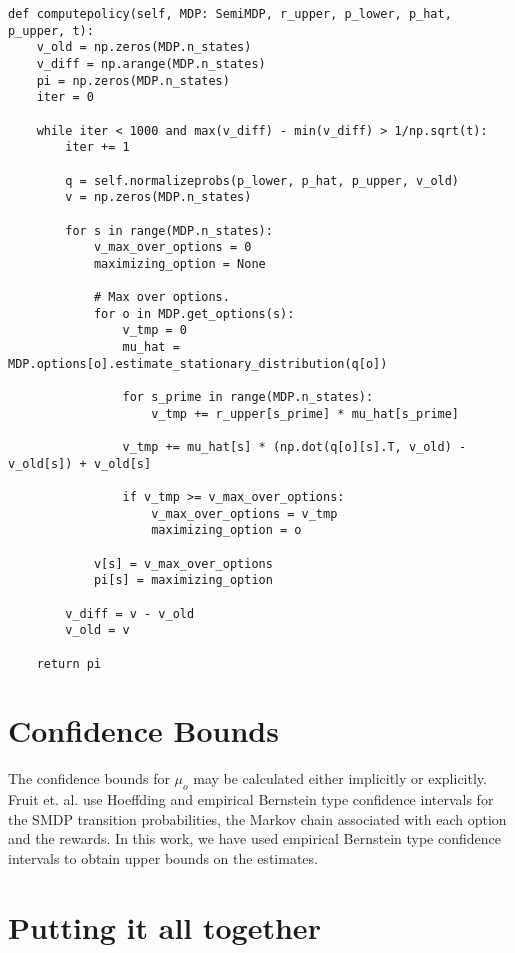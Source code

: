 \begin{verbatim}
def computepolicy(self, MDP: SemiMDP, r_upper, p_lower, p_hat, p_upper, t):
    v_old = np.zeros(MDP.n_states)
    v_diff = np.arange(MDP.n_states)
    pi = np.zeros(MDP.n_states)
    iter = 0

    while iter < 1000 and max(v_diff) - min(v_diff) > 1/np.sqrt(t):
        iter += 1

        q = self.normalizeprobs(p_lower, p_hat, p_upper, v_old)
        v = np.zeros(MDP.n_states)

        for s in range(MDP.n_states):
            v_max_over_options = 0
            maximizing_option = None

            # Max over options.
            for o in MDP.get_options(s):
                v_tmp = 0
                mu_hat = MDP.options[o].estimate_stationary_distribution(q[o])

                for s_prime in range(MDP.n_states):
                    v_tmp += r_upper[s_prime] * mu_hat[s_prime]

                v_tmp += mu_hat[s] * (np.dot(q[o][s].T, v_old) - v_old[s]) + v_old[s]

                if v_tmp >= v_max_over_options:
                    v_max_over_options = v_tmp
                    maximizing_option = o

            v[s] = v_max_over_options
            pi[s] = maximizing_option

        v_diff = v - v_old
        v_old = v

    return pi
\end{verbatim}

\section{Confidence Bounds}

The confidence bounds for $\mu_o$ may be calculated either implicitly or explicitly.
Fruit et. al. \cite{fruit_regret_2017} use Hoeffding and empirical Bernstein type confidence intervals for the SMDP transition probabilities, the Markov chain associated with each option and the rewards.
In this work, we have used empirical Bernstein type confidence intervals to obtain upper bounds on the estimates.


\section{Putting it all together}

